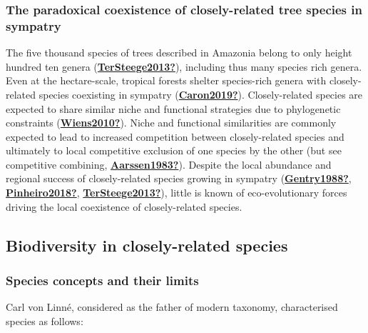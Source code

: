 \documentclass[12pt,twoside,a4paper, a]{article}
\begin{document}
\hypertarget{the-paradoxical-coexistence-of-closely-related-tree-species-in-sympatry}{%
\subsubsection{The paradoxical coexistence of closely-related tree species in sympatry}\label{the-paradoxical-coexistence-of-closely-related-tree-species-in-sympatry}}

The five thousand species of trees described in Amazonia belong to only height hundred ten genera (\protect\hyperlink{ref-TerSteege2013}{\textbf{TerSteege2013?}}), including thus many species rich genera.
Even at the hectare-scale, tropical forests shelter species-rich genera with closely-related species coexisting in sympatry (\protect\hyperlink{ref-Caron2019}{\textbf{Caron2019?}}).
Closely-related species are expected to share similar niche and functional strategies due to phylogenetic constraints (\protect\hyperlink{ref-Wiens2010}{\textbf{Wiens2010?}}).
Niche and functional similarities are commonly expected to lead to increased competition between closely-related species and ultimately to local competitive exclusion of one species by the other (but see competitive combining, \protect\hyperlink{ref-Aarssen1983}{\textbf{Aarssen1983?}}).
Despite the local abundance and regional success of closely-related species growing in sympatry (\protect\hyperlink{ref-Gentry1988}{\textbf{Gentry1988?}}, \protect\hyperlink{ref-Pinheiro2018}{\textbf{Pinheiro2018?}}, \protect\hyperlink{ref-TerSteege2013}{\textbf{TerSteege2013?}}), little is known of eco-evolutionary forces driving the local coexistence of closely-related species.

\hypertarget{biodiversity-in-closely-related-species}{%
\subsection{Biodiversity in closely-related species}\label{biodiversity-in-closely-related-species}}

\hypertarget{species-concepts-and-their-limits}{%
\subsubsection{Species concepts and their limits}\label{species-concepts-and-their-limits}}

Carl von Linné, considered as the father of modern taxonomy, characterised species as follows:
\end{document}
